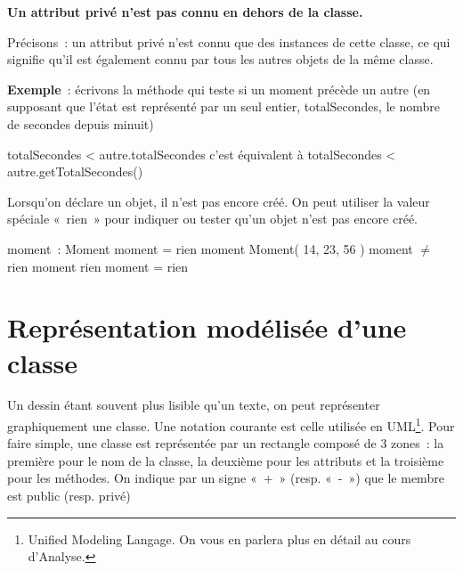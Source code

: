 	\bigskip
	
	\begin{liste}
		\item {
			\textbf{Un attribut privé n'est pas connu en dehors de la
			classe.}
			
			Précisons~: un attribut privé n'est connu que
			des instances de cette classe, ce qui signifie qu'il
			est également connu par tous les autres objets de la même
			classe.
			
			\smallskip
			\textbf{Exemple}~: 	
			écrivons la méthode qui teste si un moment précède un
			autre (en supposant que l'état est représenté par un
			seul entier, totalSecondes, le nombre de secondes depuis minuit)
			
			\bigskip
			\begin{Pseudocode}
					\Return totalSecondes < autre.totalSecondes
					\LComment c'est équivalent à  totalSecondes < autre.getTotalSecondes()
				\EndMethod
			\end{Pseudocode}
			}
			\bigskip
		\item
			Lorsqu'on déclare un objet, il n'est pas encore créé.
			On peut utiliser la valeur spéciale «~rien~»
			pour indiquer ou tester qu'un objet n'est pas encore créé.
			\\
			\bigskip
			\begin{Pseudocode}
				\Decl moment~: Moment								\RComment moment = rien
				\Let moment \Gets {} Moment( 14, 23, 56 )	\RComment moment ${\neq}$ rien
				\If{moment $\neq$ rien}
					\Let moment \Gets rien							\RComment moment = rien
				\EndIf
			\end{Pseudocode}
	\end{liste}
	
\section{Représentation modélisée d'une classe}

	Un dessin étant souvent plus lisible qu'un texte, on
	peut représenter graphiquement une classe. Une notation courante est
	celle utilisée en UML\footnote{{Unified
	Modeling Langage. }On vous en parlera plus en détail au cours
	d'Analyse.}. Pour faire simple, une classe est
	représentée par un rectangle composé de 3 zones~: la première pour le
	nom de la classe, la deuxième pour les attributs et la troisième pour
	les méthodes. On indique par un signe «~+~» (resp. «~-~») que le membre
	est public (resp. privé)

